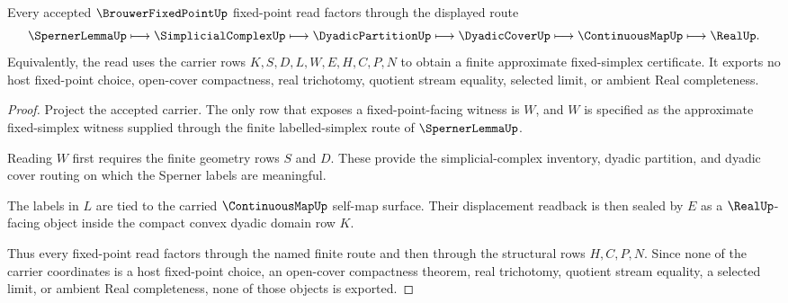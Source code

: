 \begin{theorem}
\label{thm:brouwer-fixed-point-sperner-handoff}
Every accepted $\BrouwerFixedPointUp$ fixed-point read factors through the displayed route
$$
\SpernerLemmaUp \longmapsto \SimplicialComplexUp \longmapsto \DyadicPartitionUp \longmapsto \DyadicCoverUp \longmapsto \ContinuousMapUp \longmapsto \RealUp .
$$
Equivalently, the read uses the carrier rows $K,S,D,L,W,E,H,C,P,N$ to obtain a finite approximate fixed-simplex certificate. It exports no host fixed-point choice, open-cover compactness, real trichotomy, quotient stream equality, selected limit, or ambient Real completeness.
\end{theorem}
\begin{proof}
Project the accepted carrier. The only row that exposes a fixed-point-facing witness is $W$, and $W$ is specified as the approximate fixed-simplex witness supplied through the finite labelled-simplex route of $\SpernerLemmaUp$.

Reading $W$ first requires the finite geometry rows $S$ and $D$. These provide the simplicial-complex inventory, dyadic partition, and dyadic cover routing on which the Sperner labels are meaningful.

The labels in $L$ are tied to the carried $\ContinuousMapUp$ self-map surface. Their displacement readback is then sealed by $E$ as a $\RealUp$-facing object inside the compact convex dyadic domain row $K$.

Thus every fixed-point read factors through the named finite route and then through the structural rows $H,C,P,N$. Since none of the carrier coordinates is a host fixed-point choice, an open-cover compactness theorem, real trichotomy, quotient stream equality, a selected limit, or ambient Real completeness, none of those objects is exported.
\end{proof}

